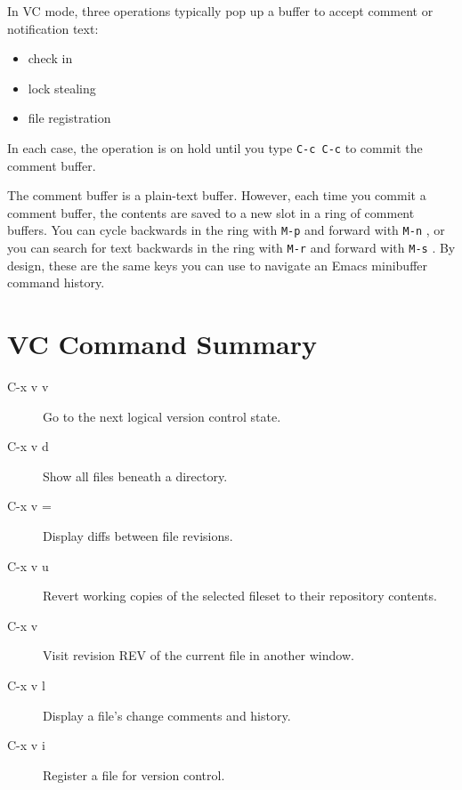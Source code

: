 In VC mode, three operations typically pop up a buffer to accept comment or notification text:
\begin{itemize}
\item check in
\item lock stealing
\item file registration
\end{itemize}
In each case, the operation is on hold until you type \verb|C-c C-c| to commit the comment buffer.


The comment buffer is a plain-text buffer.
However, each time you commit a comment buffer, the contents are saved to a new slot in a ring of comment buffers.
You can cycle backwards in the ring with \verb|M-p| and forward with \verb|M-n| , or you can search for text backwards in the ring with \verb|M-r| and forward with \verb|M-s| .
By design, these are the same keys you can use to navigate an Emacs minibuffer command history.

\section{VC Command Summary}

\begin{description}
\item[C-x v v] Go to the next logical version control state.
\item[C-x v d] Show all files beneath a directory.
\item[C-x v =] Display diffs between file revisions.
\item[C-x v u] Revert working copies of the selected fileset to their repository contents.
\item[C-x v ~] Visit revision REV of the current file in another window.
\item[C-x v l] Display a file's change comments and history.
\item[C-x v i] Register a file for version control.
\end{description}